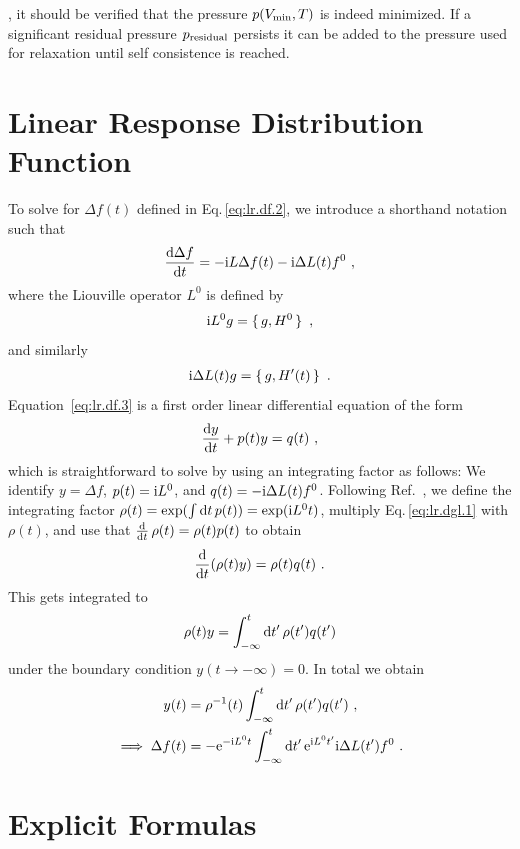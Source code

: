, it should be verified that the pressure $p (V_{\rm min}, T)$ is indeed minimized. If a significant residual pressure $p_{\rm residual}$ persists it can be added to the pressure used for relaxation until self consistence is reached.

\chapter{Linear Response Distribution Function}
\label{app:lr.f}
To solve for $\Delta f(t)$ defined in Eq.\,\eqref{eq:lr.df.2}, we introduce a shorthand notation such that
\begin{align}
\frac{\d \Delta f}{\d t} = -\im L \Delta f(t) - \im \Delta L (t) f^0~,
\label{eq:lr.df.3}
\end{align}
where the Liouville operator $L^0$ is defined by
\begin{align}
	\im L^0 g = \set{g, H^0}~,
	\label{eq:app.lr.L}
\end{align}
and similarly
\begin{align}
	\im \Delta L (t) g = \set{g, H'(t)}~.
	\label{eq:app.lr.L'}
\end{align}
Equation~\eqref{eq:lr.df.3} is a first order linear differential equation of the form
\begin{align}
	\frac{\d y}{\d t} + p(t) y = q(t)~,
	\label{eq:app.lr.dgl.1}
\end{align}
which is straightforward to solve by using an integrating factor as follows: We identify $y = \Delta f$, $p(t) = {\rm i} L^0$, and $q(t) = - {\rm i} \Delta L (t) f^0$. Following Ref.~\cite[p.\,68]{Lomen1986}, we define the integrating factor \mbox{$\rho (t) = \exp(\int {\rm d} t \, p (t)) = \exp ({\rm i} L^0 t)$}, multiply Eq.\,\eqref{eq:lr.dgl.1} with $\rho (t)$, and use that \mbox{$\frac{{\rm d}}{{\rm d} t} \, \rho(t) = \rho(t) p(t)$} to obtain
$$
\frac{{\rm d}}{{\rm d} t} (\rho (t) y) = \rho(t) q(t)~.
$$
This gets integrated to
$$
\rho(t) y = \int_{-\infty}^t {\rm d} t' \, \rho(t') q(t')
$$
under the boundary condition $y (t \to -\infty) = 0$. In total we obtain
\begin{align}
  y(t) 
    &= \rho^{-1} (t) \int_{-\infty}^t {\rm d} t' \, \rho(t') q(t')~, \\
  \implies
  \Delta f(t) 
    &= - {\rm e}^{- {\rm i} L^0 t}  \int_{-\infty}^t {\rm d} t' \, {\rm e}^{{\rm i} L^0 t'} {\rm i} \Delta L (t') f^0~.
\end{align}

\chapter{Explicit Formulas}
